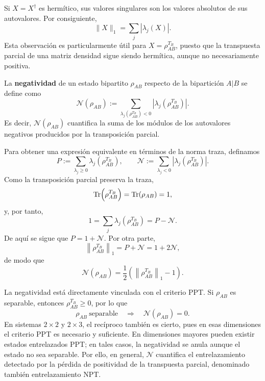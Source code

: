 \documentclass[../main.tex]{subfiles}
\begin{document}
Si $X=X^{\dagger}$ es hermítico, sus valores singulares son los valores absolutos de sus autovalores. Por consiguiente,
\begin{equation*}
    \|X\|_1=\sum_j \left|\lambda_j(X)\right|.
\end{equation*}
Esta observación es particularmente útil para $X=\rho_{AB}^{T_B}$, puesto que la transpuesta parcial de una matriz densidad sigue siendo hermítica, aunque no necesariamente positiva.

\begin{definicion}[Negatividad]
La \textbf{negatividad} de un estado bipartito $\rho_{AB}$ respecto de la bipartición $A|B$ se define como
\begin{equation*}
    \mathcal{N}(\rho_{AB})
    :=\sum_{\lambda_j(\rho_{AB}^{T_B})<0}
    \left|\lambda_j(\rho_{AB}^{T_B})\right|.
\end{equation*}
Es decir, $\mathcal{N}(\rho_{AB})$ cuantifica la suma de los módulos de los autovalores negativos producidos por la transposición parcial.
\end{definicion}

Para obtener una expresión equivalente en términos de la norma traza, definamos
\begin{equation*}
    P:=\sum_{\lambda_j\geq 0}\lambda_j\!\left(\rho_{AB}^{T_B}\right),
    \qquad
    \mathcal{N}:=\sum_{\lambda_j<0}\left|\lambda_j\!\left(\rho_{AB}^{T_B}\right)\right|.
\end{equation*}
Como la transposición parcial preserva la traza,
\begin{equation*}
    \Tr\!\left(\rho_{AB}^{T_B}\right)
    =\Tr(\rho_{AB})=1,
\end{equation*}
y, por tanto,
\begin{equation*}
    1
    =\sum_j\lambda_j\!\left(\rho_{AB}^{T_B}\right)
    =P-\mathcal{N}.
\end{equation*}
De aquí se sigue que $P=1+\mathcal{N}$. Por otra parte,
\begin{equation*}
    \left\|\rho_{AB}^{T_B}\right\|_1
    =P+\mathcal{N}
    =1+2\mathcal{N},
\end{equation*}
de modo que
\begin{equation*}
    \boxed{
    \mathcal{N}(\rho_{AB})
    =\frac{1}{2}\left(
        \left\|\rho_{AB}^{T_B}\right\|_1-1
    \right)}.
\end{equation*}

La negatividad está directamente vinculada con el criterio PPT. Si $\rho_{AB}$ es separable, entonces $\rho_{AB}^{T_B}\geq 0$, por lo que
\begin{equation*}
    \rho_{AB}\ \text{separable}
    \quad\Longrightarrow\quad
    \mathcal{N}(\rho_{AB})=0.
\end{equation*}
En sistemas $2\times 2$ y $2\times 3$, el recíproco también es cierto, pues en esas dimensiones el criterio PPT es necesario y suficiente. En dimensiones mayores pueden existir estados entrelazados PPT; en tales casos, la negatividad se anula aunque el estado no sea separable. Por ello, en general, $\mathcal{N}$ cuantifica el entrelazamiento detectado por la pérdida de positividad de la transpuesta parcial, denominado también entrelazamiento NPT.
\end{document}
